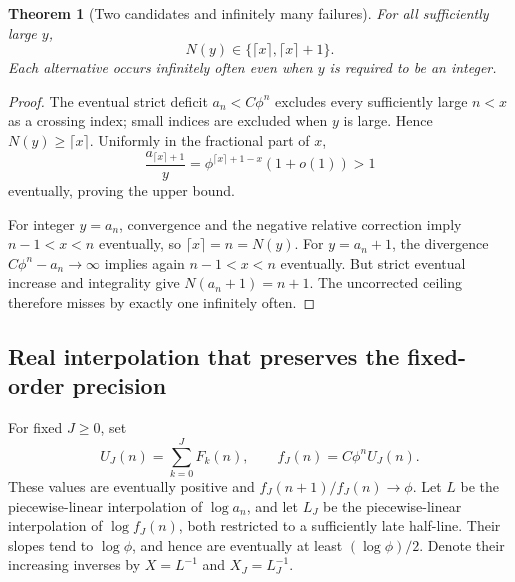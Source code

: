 \documentclass[11pt]{article}
\newtheorem{theorem}{Theorem}[section]
\theoremstyle{remark}\newtheorem{remark}[theorem]{Remark}
\begin{document}
\begin{theorem}[Two candidates and infinitely many failures]\label{sfb:hex:thm:rounding}
For all sufficiently large $y$,
\begin{equation}\label{sfb:hex:eq:twocandidates}
 N(y)\in\{\lceil x\rceil,\lceil x\rceil+1\}.
\end{equation}
Each alternative occurs infinitely often even when $y$ is required to be an integer.
\end{theorem}
\begin{proof}
The eventual strict deficit $a_n<C\phi^n$ excludes every sufficiently large $n<x$ as a crossing index; small indices are excluded when $y$ is large. Hence $N(y)\ge\lceil x\rceil$. Uniformly in the fractional part of $x$,
\[
 \frac{a_{\lceil x\rceil+1}}y
 =\phi^{\lceil x\rceil+1-x}(1+o(1))>1
\]
eventually, proving the upper bound.

For integer $y=a_n$, convergence and the negative relative correction imply $n-1<x<n$ eventually, so $\lceil x\rceil=n=N(y)$. For $y=a_n+1$, the divergence $C\phi^n-a_n\to\infty$ implies again $n-1<x<n$ eventually. But strict eventual increase and integrality give $N(a_n+1)=n+1$. The uncorrected ceiling therefore misses by exactly one infinitely often.
\end{proof}

\subsection{Real interpolation that preserves the fixed-order precision}
For fixed $J\ge0$, set
\begin{equation}\label{sfb:hex:eq:UJ}
 U_J(n)=\sum_{k=0}^JF_k(n),\qquad f_J(n)=C\phi^nU_J(n).
\end{equation}
These values are eventually positive and $f_J(n+1)/f_J(n)\to\phi$. Let $L$ be the piecewise-linear interpolation of $\log a_n$, and let $L_J$ be the piecewise-linear interpolation of $\log f_J(n)$, both restricted to a sufficiently late half-line. Their slopes tend to $\log\phi$, and hence are eventually at least $(\log\phi)/2$. Denote their increasing inverses by $X=L^{-1}$ and $X_J=L_J^{-1}$.
\end{document}
